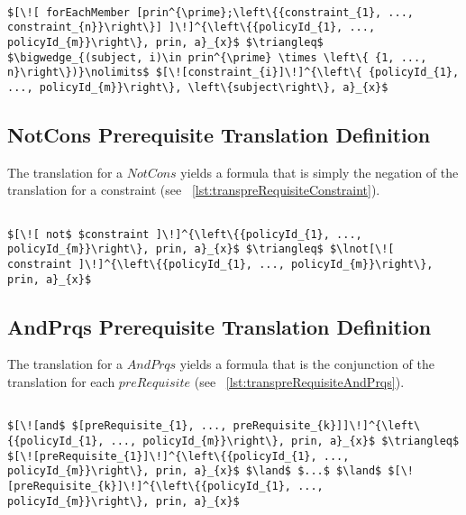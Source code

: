 \lstset{mathescape, language=AST}  
\begin{lstlisting}[frame=single, caption={Prerequisite Translation Definition {$\colon$} ForEachMember},label={lst:transpreRequisiteForEachMember}]

$[\![ forEachMember [prin^{\prime};\left\{{constraint_{1}, ..., constraint_{n}}\right\}] ]\!]^{\left\{{policyId_{1}, ..., policyId_{m}}\right\}, prin, a}_{x}$ $\triangleq$ $\bigwedge_{(subject, i)\in prin^{\prime} \times \left\{ {1, ..., n}\right\})}\nolimits$ $[\![constraint_{i}]\!]^{\left\{ {policyId_{1}, ..., policyId_{m}}\right\}, \left\{subject\right\}, a}_{x}$
\end{lstlisting}



\subsection{NotCons Prerequisite Translation Definition}
The translation for a $NotCons$ yields a formula that is simply the negation of the translation for a constraint (see ~\ref{lst:transpreRequisiteConstraint}).

\lstset{mathescape, language=AST}  
\begin{lstlisting}[frame=single, caption={Prerequisite Translation Definition {$\colon$} Not Constraint},label={lst:transpreRequisiteNotConstraint}]

$[\![ not$ $constraint ]\!]^{\left\{{policyId_{1}, ..., policyId_{m}}\right\}, prin, a}_{x}$ $\triangleq$ $\lnot[\![ constraint ]\!]^{\left\{{policyId_{1}, ..., policyId_{m}}\right\}, prin, a}_{x}$ 
\end{lstlisting}

\subsection{AndPrqs Prerequisite Translation Definition}
The translation for a $AndPrqs$ yields a formula that is the conjunction of the translation for each $preRequisite$ (see ~\ref{lst:transpreRequisiteAndPrqs}).

\lstset{mathescape, language=AST}  
\begin{lstlisting}[frame=single, caption={Prerequisite Translation Definition {$\colon$} Conjunction },label={lst:transpreRequisiteAndPrqs}]

$[\![and$ $[preRequisite_{1}, ..., preRequisite_{k}]]\!]^{\left\{{policyId_{1}, ..., policyId_{m}}\right\}, prin, a}_{x}$ $\triangleq$ $[\![preRequisite_{1}]\!]^{\left\{{policyId_{1}, ..., policyId_{m}}\right\}, prin, a}_{x}$ $\land$ $...$ $\land$ $[\![preRequisite_{k}]\!]^{\left\{{policyId_{1}, ..., policyId_{m}}\right\}, prin, a}_{x}$

\end{lstlisting}

